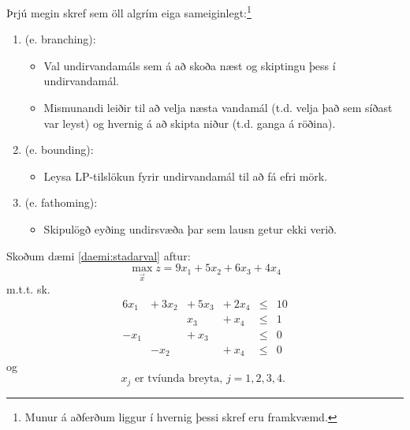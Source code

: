 Þrjú megin skref sem öll  algrím eiga sameiginlegt:\footnote{Munur á aðferðum liggur í hvernig þessi skref eru framkvæmd.}
\begin{enumerate}
\item {} (e. branching):  
\begin{itemize}
\item Val undirvandamáls sem á að skoða næst og skiptingu þess í undirvandamál.
\item Mismunandi leiðir til að velja næsta vandamál (t.d. velja það sem síðast var leyst) og hvernig á að skipta niður (t.d. ganga á röðina).
\end{itemize} 
\item {} (e. bounding): 
\begin{itemize}
\item Leysa LP-tilslökun fyrir undirvandamál til að fá efri mörk.
\end{itemize} 
\item {} (e. fathoming): 
\begin{itemize}
\item Skipulögð eyðing undirsvæða þar sem lausn getur ekki verið.
\end{itemize}
\end{enumerate}


\begin{daemi}[BIP] Skoðum dæmi \ref{daemi:stadarval} aftur:
$$ \max_{\vec{x}} z = 9 x_1 + 5  x_2 + 6 x_3 + 4 x_4$$
m.t.t. sk. 
\[\begin{array}{rrrrcl}
6 x_1 &+~ 3 x_2 &+~ 5 x_3 &+~ 2 x_4 & \le & 10 \\
      &        &    x_3 &+~   x_4 & \le & 1 \\
 -x_1 &        &+ ~  x_3 &        & \le & 0 \\
      &   -x_2 &        &  + ~x_4 & \le & 0
\end{array}\]
og
\begin{equation*}
x_j \mbox{ er tvíunda breyta, $j=1,2,3,4$. }
\end{equation*}
\end{daemi}

